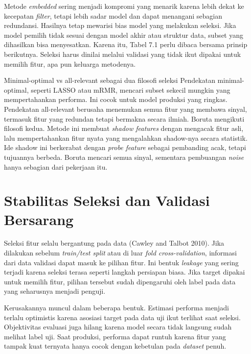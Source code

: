 Metode \emph{embedded} sering menjadi kompromi yang menarik karena lebih dekat ke kecepatan \emph{filter}, tetapi lebih sadar model dan dapat menangani sebagian redundansi. Hasilnya tetap mewarisi bias model yang melakukan seleksi. Jika model pemilih tidak sesuai dengan model akhir atau struktur data, subset yang dihasilkan bisa menyesatkan. Karena itu, Tabel 7.1 perlu dibaca bersama prinsip berikutnya. Seleksi harus dinilai melalui validasi yang tidak ikut dipakai untuk memilih fitur, apa pun keluarga metodenya.

\begin{pendalaman}{Minimal-optimal vs all-relevant sebagai dua filosofi seleksi}
Pendekatan minimal-optimal, seperti LASSO atau mRMR, mencari subset sekecil mungkin yang mempertahankan performa. Ini cocok untuk model produksi yang ringkas. Pendekatan all-relevant berusaha menemukan semua fitur yang membawa sinyal, termasuk fitur yang redundan tetapi bermakna secara ilmiah. Boruta mengikuti filosofi kedua. Metode ini membuat \emph{shadow features} dengan mengacak fitur asli, lalu mempertahankan fitur nyata yang mengalahkan shadow-nya secara statistik. Ide shadow ini berkerabat dengan \emph{probe feature} sebagai pembanding acak, tetapi tujuannya berbeda. Boruta mencari semua sinyal, sementara pembuangan \emph{noise} hanya sebagian dari pekerjaan itu.
\end{pendalaman}

\section{Stabilitas Seleksi dan Validasi Bersarang}\label{stabilitas-seleksi-dan-validasi-bersarang}

Seleksi fitur selalu bergantung pada data (Cawley and Talbot 2010). Jika dilakukan sebelum \emph{train/test split} atau di luar \emph{fold cross-validation}, informasi dari data validasi dapat masuk ke pilihan fitur. Ini bentuk \emph{leakage} yang sering terjadi karena seleksi terasa seperti langkah persiapan biasa. Jika target dipakai untuk memilih fitur, pilihan tersebut sudah dipengaruhi oleh label pada data yang seharusnya menjadi penguji.

Kerusakannya muncul dalam beberapa bentuk. Estimasi performa menjadi terlalu optimistis karena asosiasi target pada data uji ikut terlihat saat seleksi. Objektivitas evaluasi juga hilang karena model secara tidak langsung sudah melihat label uji. Saat produksi, performa dapat runtuh karena fitur yang tampak kuat ternyata hanya cocok dengan kebetulan pada \emph{dataset} penuh.

